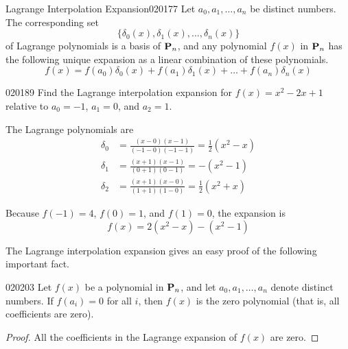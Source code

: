 \begin{theorem}{Lagrange Interpolation Expansion}{020177}
Let $a_{0}, a_{1}, \dots, a_{n}$ be distinct numbers. The corresponding set
\begin{equation*}
\{\delta_0(x), \delta_1(x), \dots, \delta_n(x) \}
\end{equation*}
of Lagrange polynomials is a basis of $\textbf{P}_{n}$, and any polynomial $f(x)$ in $\textbf{P}_{n}$ has the following unique expansion as a linear combination of these polynomials.
\begin{equation*}
f(x) = f(a_0)\delta_0(x) + f(a_1)\delta_1(x) + \dots + f(a_n)\delta_n(x)
\end{equation*}
\end{theorem}

\begin{example}{}{020189}
Find the Lagrange interpolation expansion for $f(x) = x^{2} - 2x + 1$ relative to $a_{0} = -1$, $a_{1} = 0$, and $a_{2} = 1$.

\begin{solution}
The Lagrange polynomials are
\begin{align*}
\delta_0 & = \frac{(x - 0)(x - 1)}{(-1 - 0)(-1 - 1)} = \frac{1}{2}(x^2 - x) \\
\delta_1 & = \frac{(x + 1)(x - 1)}{( 0 + 1)( 0 - 1)} = -(x^2 - 1) \\
\delta_2 & = \frac{(x + 1)(x - 0)}{( 1 + 1)( 1 - 0)} = \frac{1}{2}(x^2 + x)
\end{align*}

Because $f(-1) = 4$, $f(0) = 1$, and $f(1) = 0$, the expansion is
\begin{equation*}
f(x) = 2(x^2 - x) - (x^2 - 1)
\end{equation*}
\end{solution}
\end{example}

The Lagrange interpolation expansion gives an easy proof of the following important fact.

\begin{theorem}{}{020203}
Let $f(x)$ be a polynomial in $\textbf{P}_{n}$, and let $a_{0}, a_{1}, \dots, a_{n}$ denote distinct numbers. If $f(a_{i}) = 0$ for all $i$, then $f(x)$ is the zero polynomial (that is, all coefficients are zero).
\end{theorem}

\begin{proof}
All the coefficients in the Lagrange expansion of $f(x)$ are zero.
\end{proof}

